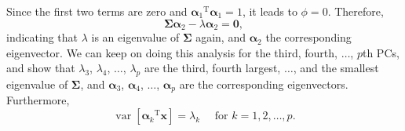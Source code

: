 Since the first two terms are zero and ${\boldsymbol{\alpha}_1}^{\operatorname{T}} \boldsymbol{\alpha}_1=1$, it leads to $\phi=0$. Therefore,
\begin{equation}
	\boldsymbol{\Sigma} \boldsymbol{\alpha}_2-\lambda \boldsymbol{\alpha}_2=\mathbf{0},
\end{equation}
indicating that $\lambda$ is an eigenvalue of $\boldsymbol{\Sigma}$ again, and $\boldsymbol{\alpha}_2$ the corresponding eigenvector. We can keep on doing this analysis for the third, fourth, $\dots$, $p$th PCs, and show that $\lambda_3$, $\lambda_4$, $\dots$, $\lambda_p$ are the third, fourth largest, $\dots$, and the smallest eigenvalue of $\boldsymbol{\Sigma}$, and $\boldsymbol{\alpha}_3$, $\boldsymbol{\alpha}_4$, $\dots$, $\boldsymbol{\alpha}_p$ are the corresponding eigenvectors. Furthermore,
\begin{equation}
	\operatorname{var}\left[{\boldsymbol{\alpha}_k}^{\operatorname{T}} \mathbf{x}\right]=\lambda_k \quad \text { for } k=1,2, \ldots, p.
\end{equation}